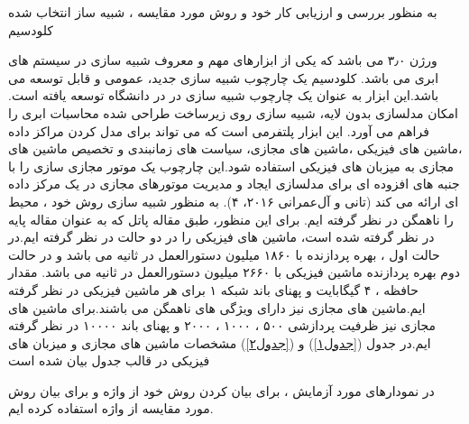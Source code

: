 \label{فصل‌بررسی}
  به منظور بررسی و ارزیابی کار خود و روش مورد مقایسه ، شبیه ساز انتخاب شده کلودسیم

   ورژن
۳٫۰
         می باشد که یکی از ابزارهای مهم و معروف شبیه سازی در سیستم های ابری می باشد. کلودسیم یک چارچوب شبیه سازی جدید، عمومی و قابل توسعه می باشد.این ابزار به عنوان یک چارچوب شبیه سازی در در دانشگاه 
         توسعه یافته است. امکان مدلسازی بدون لایه، شبیه سازی روی زیرساخت طراحی شده محاسبات ابری را فراهم می آورد. این ابزار پلتفرمی است که می تواند برای مدل کردن مراکز داده ،ماشین های فیزیکی ،ماشین های مجازی،  سیاست های زمانبندی و تخصیص ماشین های مجازی به میزبان های فیزیکی استفاده شود.این چارچوب یک موتور مجازی سازی را با جنبه های افزوده ای برای مدلسازی ایجاد و مدیریت موتورهای مجازی در یک مرکز داده ای ارائه می کند (تانی و آل‌عمرانی ۲۰۱۶، ۴).
         به منظور شبیه سازی روش خود ، محیط را ناهمگن در نظر گرفته ایم. برای این منظور، طبق مقاله پاتل
          که به عنوان مقاله پایه در نظر گرفته شده است، ماشین های فیزیکی را در  دو حالت در نظر گرفته ایم.در حالت اول ، بهره پردازنده با
           ۱۸۶۰ 
          میلیون دستورالعمل در ثانیه
            می باشد و در حالت دوم بهره پردازنده ماشین فیزیکی با 
          ۲۶۶۰ 
          میلیون دستورالعمل در ثانیه می باشد. مقدار حافظه
            ،
             ۴
           گیگابایت و پهنای باند شبکه 
           ۱
           برای هر ماشین فیزیکی در نظر گرفته ایم.ماشین های مجازی نیز دارای ویژگی های ناهمگن می باشند.برای ماشین های مجازی نیز ظرفیت پردازشی
            ۵۰۰
             ، 
             ۱۰۰۰
             ، 
             ۲۰۰۰ 
           و پهنای باند
            ۱۰۰۰۰ 
           در نظر گرفته ایم.در جدول 
(\ref{جدول۱})
            و
(\ref{جدول۲})
              مشخصات ماشین های مجازی و میزبان های فیزیکی در قالب جدول بیان شده است
           \newpage
 
 
در نمودارهای مورد آزمایش ، برای بیان کردن روش خود از واژه
و برای بیان روش مورد مقایسه از واژه
استفاده کرده ایم. 

